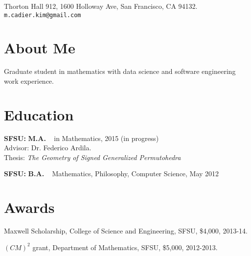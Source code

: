 \documentclass[margin,line,pifont,palatino,courier]{res}
\newenvironment{list1}{
  \begin{list}{\label{}}{%
      \setlength{\itemsep}{0in}
      \setlength{\parsep}{0in} \setlength{\parskip}{0in}
      \setlength{\topsep}{0in} \setlength{\partopsep}{0in}
      \setlength{\leftmargin}{0.0in}}}{\end{list}}
\begin{document}


\begin{resume}
\begin{flushright}
{\small
Thorton Hall 912, 1600 Holloway Ave, San Francisco, CA 94132. \\
  \verb+m.cadier.kim@gmail.com+
}
\end{flushright}
 
\section{\sc  About Me}

Graduate student in mathematics with data science and software engineering work experience. 





 \section{\sc Education} 
\begin{list1}
\item  {\bf SFSU:}  \textbf{M.A.} ~ in Mathematics, 2015 (in progress) \\
Advisor: Dr. Federico Ardila. \\
 Thesis: {\em The Geometry of Signed Generalized Permutohedra} 


\item  {\bf SFSU:}  \textbf{B.A.} ~ Mathematics, Philosophy, Computer Science, May 2012 

\end{list1}





 \section{\sc Awards}
\begin{list1}
  \item  Maxwell Scholarship, College of Science and Engineering, SFSU, \$4,000,  2013-14.
  \item $(CM)^2$ grant, Department of Mathematics, SFSU, \$5,000, 2012-2013.
\end{list1}







\end{resume}
\end{document}
